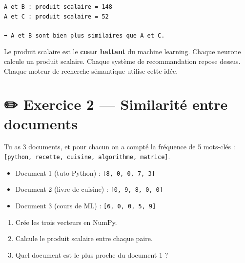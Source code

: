 \documentclass[
  french,
  11pt,
  a4paper,
]{scrbook}
\providecommand{\tightlist}{%
  \setlength{\itemsep}{0pt}\setlength{\parskip}{0pt}}
\begin{document}
\begin{verbatim}
A et B : produit scalaire = 148
A et C : produit scalaire = 52

➡️ A et B sont bien plus similaires que A et C.
\end{verbatim}

\begin{tcolorbox}[enhanced jigsaw, arc=.35mm, bottomrule=.15mm, bottomtitle=1mm, breakable, colback=white, colbacktitle=quarto-callout-important-color!10!white, colframe=quarto-callout-important-color-frame, coltitle=black, left=2mm, leftrule=.75mm, opacityback=0, opacitybacktitle=0.6, rightrule=.15mm, title=\textcolor{quarto-callout-important-color}{\faExclamation}\hspace{0.5em}{🧠 À retenir}, titlerule=0mm, toprule=.15mm, toptitle=1mm]

Le produit scalaire est le \textbf{cœur battant} du machine learning.
Chaque neurone calcule un produit scalaire. Chaque système de
recommandation repose dessus. Chaque moteur de recherche sémantique
utilise cette idée.

\end{tcolorbox}

\section{✏️ Exercice 2 --- Similarité entre
documents}\label{exercice-2-similarituxe9-entre-documents}

\begin{tcolorbox}[enhanced jigsaw, arc=.35mm, bottomrule=.15mm, bottomtitle=1mm, breakable, colback=white, colbacktitle=quarto-callout-note-color!10!white, colframe=quarto-callout-note-color-frame, coltitle=black, left=2mm, leftrule=.75mm, opacityback=0, opacitybacktitle=0.6, rightrule=.15mm, title={📝 Énoncé}, titlerule=0mm, toprule=.15mm, toptitle=1mm]

Tu as 3 documents, et pour chacun on a compté la fréquence de 5
mots-clés :
\texttt{{[}python,\ recette,\ cuisine,\ algorithme,\ matrice{]}}.

\begin{itemize}
\tightlist
\item
  Document 1 (tuto Python) : \texttt{{[}8,\ 0,\ 0,\ 7,\ 3{]}}
\item
  Document 2 (livre de cuisine) : \texttt{{[}0,\ 9,\ 8,\ 0,\ 0{]}}
\item
  Document 3 (cours de ML) : \texttt{{[}6,\ 0,\ 0,\ 5,\ 9{]}}
\end{itemize}

\begin{enumerate}
\def\labelenumi{\arabic{enumi}.}
\tightlist
\item
  Crée les trois vecteurs en NumPy.
\item
  Calcule le produit scalaire entre chaque paire.
\item
  Quel document est le plus proche du document 1 ?
\end{enumerate}

\end{tcolorbox}
\end{document}
